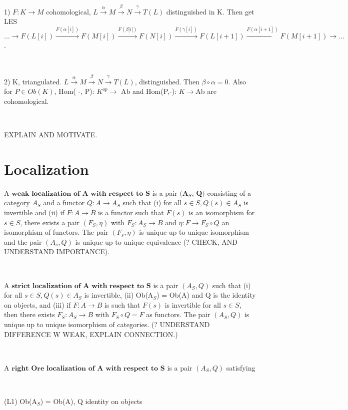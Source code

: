 \documentclass[12pt]{amsart}    %
\theoremstyle{definition}
\begin{document}
1) $F: K \rightarrow M$ cohomological, $L \xrightarrow {\alpha} M \xrightarrow{\beta} N \xrightarrow{\gamma} T(L)$ distinguished in K.  Then get LES $ \hdots \rightarrow F(L[i]) \xrightarrow{F(\alpha[i])} F(M[i]) \xrightarrow{F(\beta[i[)} F(N[i]) \xrightarrow{F(\gamma[i])} F(L[i+1]) \xrightarrow{F(\alpha[i+1])} F(M[i+1]) \rightarrow \hdots$.

\

2) K, triangulated. $L \xrightarrow{\alpha} M \xrightarrow{\beta} N \xrightarrow{\gamma} T(L)$, distinguished.  Then $\beta \circ \alpha = 0$. Also for $P \in Ob(K)$, Hom( -, P): $K^{op} \rightarrow$ Ab and Hom(P,-): $K \rightarrow $Ab are cohomological.

\

EXPLAIN AND MOTIVATE. 

\section{Localization}


A $\textbf{weak localization of A with respect to S}$ is a pair $\textbf{(A$_S$, Q)}$ consisting of a category $A_S$ and a functor $Q: A \rightarrow A_S$ such that (i) for all $s \in S, Q(s) \in A_S$ is invertible and (ii) if $F: A \rightarrow B$ is a functor such that $F(s)$ is an isomorphism for $s \in S$, there exists a pair $(F_S, \eta)$ with $F_S: A_S \rightarrow B$ and $\eta: F \rightarrow F_S \circ Q$ an isomorphism of functors.  The pair $(F_s, \eta)$ is unique up to unique isomorphism and the pair $(A_s, Q)$ is unique up to unique equivalence (? CHECK, AND UNDERSTAND IMPORTANCE).

\

A $\textbf{strict localization of A with respect to S}$ is a pair $(A_S, Q)$ such that (i) for all $s \in S, Q(s) \in A_S$ is invertible, (ii) Ob(A$_S$) = Ob(A) and Q is the identity on objects, and (iii) if $F: A \rightarrow B$ is such that $F(s)$ is invertible for all $s \in S$, then there exists $F_S: A_S \rightarrow B$ with $F_S \circ Q = F$ as functors. The pair $(A_S,Q)$ is unique up to unique isomorphism of categories.  (? UNDERSTAND DIFFERENCE W WEAK, EXPLAIN CONNECTION.)

\

A $\textbf{right Ore localization of A with respect to S}$ is a pair $(A_S, Q)$ satisfying 

\

(L1) Ob(A$_S$) = Ob(A), Q identity on objects

\
\end{document}
